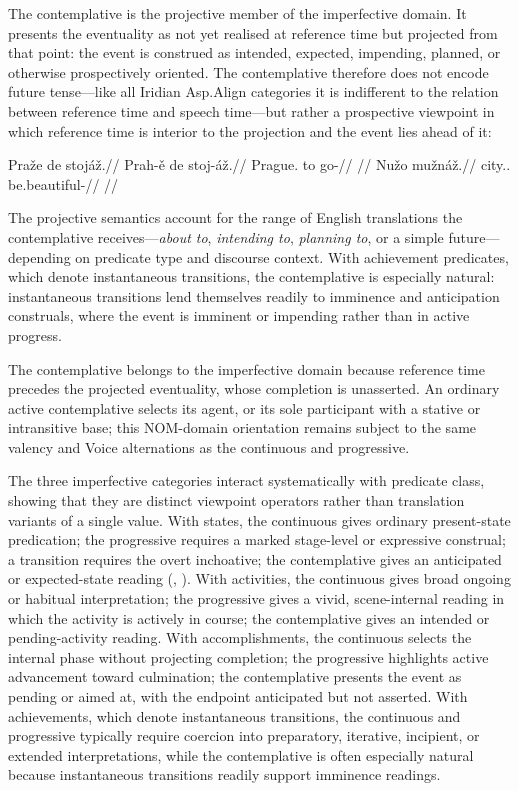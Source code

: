 The contemplative is the projective member of the imperfective domain. It
presents the eventuality as not yet realised at reference time but projected
from that point: the event is construed as intended, expected, impending,
planned, or otherwise prospectively oriented. The contemplative therefore does
not encode future tense---like all Iridian Asp.Align categories it is
indifferent to the relation between reference time and speech time---but rather
a prospective viewpoint in which reference time is interior to the projection
and the event lies ahead of it:

\pex
\a
\begingl
\gla Praže de stojáž.//
\glb Prah-ě de stoj-áž.//
\glc Prague.\Ind{} to go-\Ctpl{}//
\glft {}//
\endgl
\a
\begingl
\gla Nužo mužnáž.//
\glb city.\Dir{}.\Def{} be.beautiful-\Ctpl{}//
\glft {}//
\endgl
\xe

The projective semantics account for the range of English translations the
contemplative receives---\textit{about to}, \textit{intending to},
\textit{planning to}, or a simple future---depending on predicate type and
discourse context. With achievement predicates, which denote instantaneous
transitions, the contemplative is especially natural: instantaneous transitions
lend themselves readily to imminence and anticipation construals, where the
event is imminent or impending rather than in active progress.

The contemplative belongs to the imperfective domain because reference time
precedes the projected eventuality, whose completion is unasserted. An ordinary
active contemplative selects its agent, or its sole participant with a stative
or intransitive base; this NOM-domain orientation remains subject to the same
valency and Voice alternations as the continuous and progressive.

The three imperfective categories interact systematically with predicate class,
showing that they are distinct viewpoint operators rather than translation
variants of a single value. With {states}, the continuous gives ordinary
present-state predication; the progressive requires a marked stage-level or expressive construal;
a transition requires the overt inchoative; the contemplative gives an anticipated or expected-state reading
(, ). With {activities}, the
continuous gives broad ongoing or habitual interpretation; the progressive gives
a vivid, scene-internal reading in which the activity is actively in course; the
contemplative gives an intended or pending-activity reading. With
{accomplishments}, the continuous selects the internal phase without projecting
completion; the progressive highlights active advancement toward culmination;
the contemplative presents the event as pending or aimed at, with the endpoint
anticipated but not asserted. With {achievements}, which denote instantaneous
transitions, the continuous and progressive typically require coercion into
preparatory, iterative, incipient, or extended interpretations, while the
contemplative is often especially natural because instantaneous transitions
readily support imminence readings.

